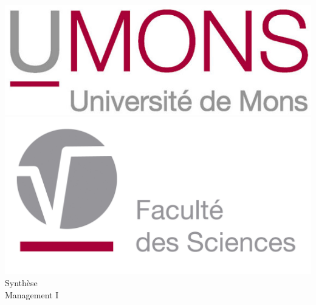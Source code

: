 \documentclass[letterpaper, 12pt]{article}
\author{%
    Author 1 name \\
    Department name \\
    \texttt{email1@example.com}\vspace{20pt} \\
    Author 2 name \\
    Department name \\
    \texttt{email2@example.com}
    }
\begin{document}
\begin{titlepage}

\noindent




\begin{center}
\includegraphics[scale=1.2]{Images/UMONS}\\
\vspace*{0.3cm}
\includegraphics[scale=0.23]{Images/FS_Logo}\\
\vspace*{2.5cm}
\titlefont Synth\`ese\\Management I \par
\end{center}
\vspace*{3cm}
\hfill
\begin{minipage}{0.18\linewidth}
  \begin{flushright}

\end{flushright}
\end{minipage}
\end{titlepage}
\end{document}

